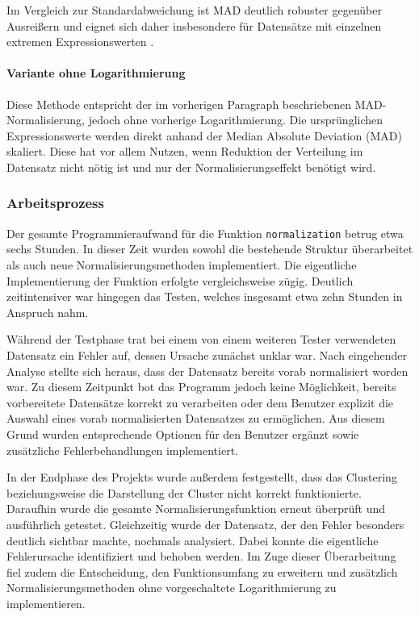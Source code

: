 \documentclass[12pt]{article}
\begin{document}
Im Vergleich zur Standardabweichung ist MAD deutlich robuster gegenüber Ausreißern und eignet sich daher insbesondere für Datensätze mit einzelnen extremen Expressionswerten \cite{MADKappal}.

\paragraph{Variante ohne Logarithmierung}

Diese Methode entspricht der im vorherigen Paragraph beschriebenen MAD-Normalisierung, jedoch ohne vorherige Logarithmierung. Die ursprünglichen Expressionswerte werden direkt anhand der Median Absolute Deviation (MAD) skaliert. Diese hat vor allem Nutzen, wenn Reduktion der Verteilung im Datensatz nicht nötig ist und nur der Normalisierungseffekt benötigt wird.

\subsubsection{Arbeitsprozess}
\label{Arbeitsprozess}

Der gesamte Programmieraufwand für die Funktion \texttt{normalization} betrug etwa sechs Stunden. In dieser Zeit wurden sowohl die bestehende Struktur überarbeitet als auch neue Normalisierungsmethoden implementiert. Die eigentliche Implementierung der Funktion erfolgte vergleichsweise zügig. Deutlich zeitintensiver war hingegen das Testen, welches insgesamt etwa zehn Stunden in Anspruch nahm.

Während der Testphase trat bei einem von einem weiteren Tester verwendeten Datensatz ein Fehler auf, dessen Ursache zunächst unklar war. Nach eingehender Analyse stellte sich heraus, dass der Datensatz bereits vorab normalisiert worden war. Zu diesem Zeitpunkt bot das Programm jedoch keine Möglichkeit, bereits vorbereitete Datensätze korrekt zu verarbeiten oder dem Benutzer explizit die Auswahl eines vorab normalisierten Datensatzes zu ermöglichen. Aus diesem Grund wurden entsprechende Optionen für den Benutzer ergänzt sowie zusätzliche Fehlerbehandlungen implementiert.

In der Endphase des Projekts wurde außerdem festgestellt, dass das Clustering beziehungsweise die Darstellung der Cluster nicht korrekt funktionierte. Daraufhin wurde die gesamte Normalisierungsfunktion erneut überprüft und ausführlich getestet. Gleichzeitig wurde der Datensatz, der den Fehler besonders deutlich sichtbar machte, nochmals analysiert. Dabei konnte die eigentliche Fehlerursache identifiziert und behoben werden. Im Zuge dieser Überarbeitung fiel zudem die Entscheidung, den Funktionsumfang zu erweitern und zusätzlich Normalisierungsmethoden ohne vorgeschaltete Logarithmierung zu implementieren.
\end{document}
